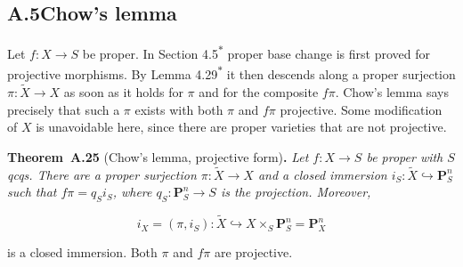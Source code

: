 \documentclass[11pt]{article}
\newenvironment{bpstatement}[2]{\par\addvspace{0.6\baselineskip}\noindent\textbf{#1}#2\textbf{.}\enspace\ignorespaces}
  {\par\addvspace{0.4\baselineskip}}
\newenvironment{bpstatementit}[2]{\begin{bpstatement}{#1}{#2}\itshape\ignorespaces}{\end{bpstatement}}
\newcommand{\bpout}[1]{#1\textsuperscript{\hyperlink{bp-outside}{\ensuremath{\ast}}}}
\begin{document}
\subsection*{\texorpdfstring{A.5\quad Chow's lemma}{A.5 Chow's lemma}}
\label{bp71}%
\label{bp72}%
Let \(f:X\to S\) be proper. In Section \bpout{4.5} proper base change is first proved for projective morphisms. By Lemma \bpout{4.29} it then descends along a proper surjection \(\pi:\widetilde X\to X\) as soon as it holds for \(\pi\) and for the composite \(f\pi\). Chow's lemma says precisely that such a \(\pi\) exists with both \(\pi\) and \(f\pi\) projective. Some modification of \(X\) is unavoidable here, since there are proper varieties that are not projective.

\label{bp73}%
\begin{bpstatementit}{Theorem~A.25}{ (Chow's lemma, projective form)}
Let \(f:X\to S\) be proper with \(S\) qcqs. There are a proper surjection \(\pi:\widetilde X\to X\) and a closed immersion \(i_S:\widetilde X\hookrightarrow\mathbf P^n_S\) such that \(f\pi=q_Si_S\), where \(q_S:\mathbf P^n_S\to S\) is the projection. Moreover,

\[
i_X=(\pi,i_S):\widetilde X\hookrightarrow
X\times_S\mathbf P^n_S=\mathbf P^n_X
\]

is a closed immersion. Both \(\pi\) and \(f\pi\) are projective.
\end{bpstatementit}
\end{document}

